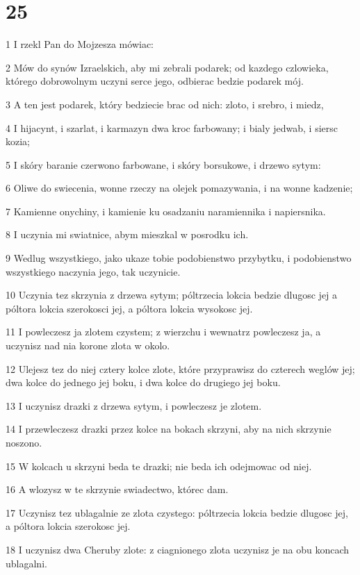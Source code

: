 \chapter{25}

\par 1 I rzekl Pan do Mojzesza mówiac:
\par 2 Mów do synów Izraelskich, aby mi zebrali podarek; od kazdego czlowieka, którego dobrowolnym uczyni serce jego, odbierac bedzie podarek mój.
\par 3 A ten jest podarek, który bedziecie brac od nich: zloto, i srebro, i miedz,
\par 4 I hijacynt, i szarlat, i karmazyn dwa kroc farbowany; i bialy jedwab, i siersc kozia;
\par 5 I skóry baranie czerwono farbowane, i skóry borsukowe, i drzewo sytym:
\par 6 Oliwe do swiecenia, wonne rzeczy na olejek pomazywania, i na wonne kadzenie;
\par 7 Kamienne onychiny, i kamienie ku osadzaniu naramiennika i napiersnika.
\par 8 I uczynia mi swiatnice, abym mieszkal w posrodku ich.
\par 9 Wedlug wszystkiego, jako ukaze tobie podobienstwo przybytku, i podobienstwo wszystkiego naczynia jego, tak uczynicie.
\par 10 Uczynia tez skrzynia z drzewa sytym; póltrzecia lokcia bedzie dlugosc jej a póltora lokcia szerokosci jej, a póltora lokcia wysokosc jej.
\par 11 I powleczesz ja zlotem czystem; z wierzchu i wewnatrz powleczesz ja, a uczynisz nad nia korone zlota w okolo.
\par 12 Ulejesz tez do niej cztery kolce zlote, które przyprawisz do czterech weglów jej; dwa kolce do jednego jej boku, i dwa kolce do drugiego jej boku.
\par 13 I uczynisz drazki z drzewa sytym, i powleczesz je zlotem.
\par 14 I przewleczesz drazki przez kolce na bokach skrzyni, aby na nich skrzynie noszono.
\par 15 W kolcach u skrzyni beda te drazki; nie beda ich odejmowac od niej.
\par 16 A wlozysz w te skrzynie swiadectwo, którec dam.
\par 17 Uczynisz tez ublagalnie ze zlota czystego: póltrzecia lokcia bedzie dlugosc jej, a póltora lokcia szerokosc jej.
\par 18 I uczynisz dwa Cheruby zlote: z ciagnionego zlota uczynisz je na obu koncach ublagalni.
